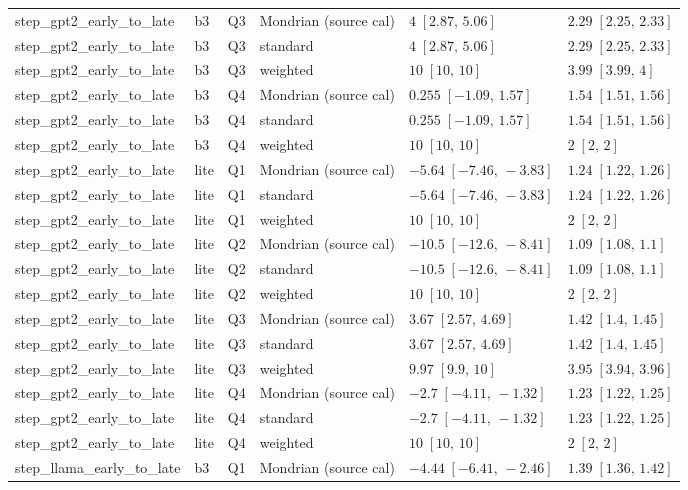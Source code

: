 \begin{longtable}{@{}p{}p{}p{}p{}p{}p{}@{}}
step\_gpt2\_early\_to\_late & b3 & Q3 & Mondrian (source cal) & $4\;[2.87,\,5.06]$ & $2.29\;[2.25,\,2.33]$ \\
step\_gpt2\_early\_to\_late & b3 & Q3 & standard & $4\;[2.87,\,5.06]$ & $2.29\;[2.25,\,2.33]$ \\
step\_gpt2\_early\_to\_late & b3 & Q3 & weighted & $10\;[10,\,10]$ & $3.99\;[3.99,\,4]$ \\
step\_gpt2\_early\_to\_late & b3 & Q4 & Mondrian (source cal) & $0.255\;[-1.09,\,1.57]$ & $1.54\;[1.51,\,1.56]$ \\
step\_gpt2\_early\_to\_late & b3 & Q4 & standard & $0.255\;[-1.09,\,1.57]$ & $1.54\;[1.51,\,1.56]$ \\
step\_gpt2\_early\_to\_late & b3 & Q4 & weighted & $10\;[10,\,10]$ & $2\;[2,\,2]$ \\
step\_gpt2\_early\_to\_late & lite & Q1 & Mondrian (source cal) & $-5.64\;[-7.46,\,-3.83]$ & $1.24\;[1.22,\,1.26]$ \\
step\_gpt2\_early\_to\_late & lite & Q1 & standard & $-5.64\;[-7.46,\,-3.83]$ & $1.24\;[1.22,\,1.26]$ \\
step\_gpt2\_early\_to\_late & lite & Q1 & weighted & $10\;[10,\,10]$ & $2\;[2,\,2]$ \\
step\_gpt2\_early\_to\_late & lite & Q2 & Mondrian (source cal) & $-10.5\;[-12.6,\,-8.41]$ & $1.09\;[1.08,\,1.1]$ \\
step\_gpt2\_early\_to\_late & lite & Q2 & standard & $-10.5\;[-12.6,\,-8.41]$ & $1.09\;[1.08,\,1.1]$ \\
step\_gpt2\_early\_to\_late & lite & Q2 & weighted & $10\;[10,\,10]$ & $2\;[2,\,2]$ \\
step\_gpt2\_early\_to\_late & lite & Q3 & Mondrian (source cal) & $3.67\;[2.57,\,4.69]$ & $1.42\;[1.4,\,1.45]$ \\
step\_gpt2\_early\_to\_late & lite & Q3 & standard & $3.67\;[2.57,\,4.69]$ & $1.42\;[1.4,\,1.45]$ \\
step\_gpt2\_early\_to\_late & lite & Q3 & weighted & $9.97\;[9.9,\,10]$ & $3.95\;[3.94,\,3.96]$ \\
step\_gpt2\_early\_to\_late & lite & Q4 & Mondrian (source cal) & $-2.7\;[-4.11,\,-1.32]$ & $1.23\;[1.22,\,1.25]$ \\
step\_gpt2\_early\_to\_late & lite & Q4 & standard & $-2.7\;[-4.11,\,-1.32]$ & $1.23\;[1.22,\,1.25]$ \\
step\_gpt2\_early\_to\_late & lite & Q4 & weighted & $10\;[10,\,10]$ & $2\;[2,\,2]$ \\
step\_llama\_early\_to\_late & b3 & Q1 & Mondrian (source cal) & $-4.44\;[-6.41,\,-2.46]$ & $1.39\;[1.36,\,1.42]$ \\

\end{longtable}
